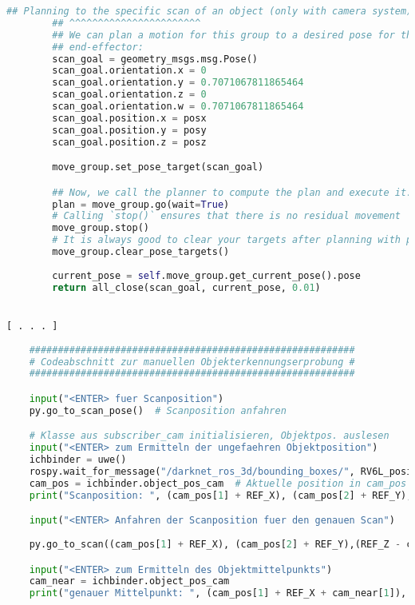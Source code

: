 \begin{lstlisting}[language=python]
        ## Planning to the specific scan of an object (only with camera system)
        ## ^^^^^^^^^^^^^^^^^^^^^^^
        ## We can plan a motion for this group to a desired pose for the
        ## end-effector:
        scan_goal = geometry_msgs.msg.Pose()
        scan_goal.orientation.x = 0
        scan_goal.orientation.y = 0.7071067811865464
        scan_goal.orientation.z = 0
        scan_goal.orientation.w = 0.7071067811865464
        scan_goal.position.x = posx
        scan_goal.position.y = posy
        scan_goal.position.z = posz

        move_group.set_pose_target(scan_goal)

        ## Now, we call the planner to compute the plan and execute it.
        plan = move_group.go(wait=True)
        # Calling `stop()` ensures that there is no residual movement
        move_group.stop()
        # It is always good to clear your targets after planning with poses.
        move_group.clear_pose_targets()
     
        current_pose = self.move_group.get_current_pose().pose
        return all_close(scan_goal, current_pose, 0.01)


[ . . . ]
    
    #########################################################
    # Codeabschnitt zur manuellen Objekterkennungserprobung #
    #########################################################

    input("<ENTER> fuer Scanposition")
    py.go_to_scan_pose()  # Scanposition anfahren

    # Klasse aus subscriber_cam initialisieren, Objektpos. auslesen
    input("<ENTER> zum Ermitteln der ungefaehren Objektposition")
    ichbinder = uwe()
    rospy.wait_for_message("/darknet_ros_3d/bounding_boxes/", RV6L_positions, timeout=None)
    cam_pos = ichbinder.object_pos_cam  # Aktuelle position in cam_pos speichern
    print("Scanposition: ", (cam_pos[1] + REF_X), (cam_pos[2] + REF_Y),(REF_Z - cam_pos[3] + SCAN_NEAR))

    input("<ENTER> Anfahren der Scanposition fuer den genauen Scan")
                     
    py.go_to_scan((cam_pos[1] + REF_X), (cam_pos[2] + REF_Y),(REF_Z - cam_pos[3] + SCAN_NEAR))  # Anfahren der Scanposition ~ ueber dem Bauteil

    input("<ENTER> zum Ermitteln des Objektmittelpunkts")
    cam_near = ichbinder.object_pos_cam
    print("genauer Mittelpunkt: ", (cam_pos[1] + REF_X + cam_near[1]), (cam_pos[2] + REF_Y + cam_near[2]),(REF_Z - cam_pos[3] + SCAN_NEAR - (cam_near[3] - SCAN_NEAR)))
    

\end{lstlisting}
